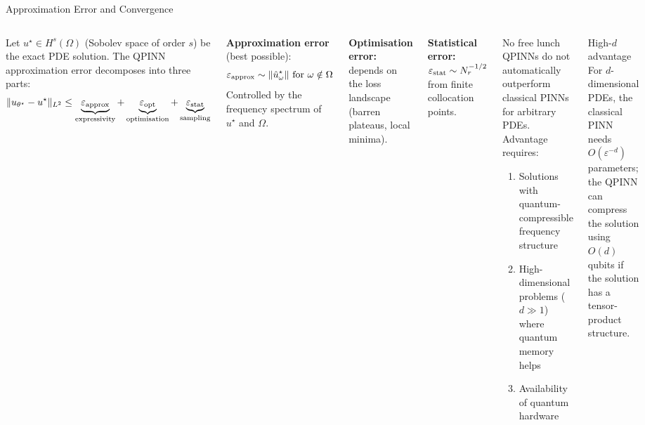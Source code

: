 \documentclass[aspectratio=169,10pt]{beamer}
\begin{document}
\begin{frame}{Approximation Error and Convergence}
  \begin{columns}[T]
      Let $u^\star\in H^s(\Omega)$ (Sobolev space of order $s$)
      be the exact PDE solution. The QPINN approximation error
      decomposes into three parts:
      \[
        \|u_{\theta^\star} - u^\star\|_{L^2}
        \leq \underbrace{\varepsilon_{\rm approx}}_{\text{expressivity}}
           + \underbrace{\varepsilon_{\rm opt}}_{\text{optimisation}}
           + \underbrace{\varepsilon_{\rm stat}}_{\text{sampling}}
      \]

      \textbf{Approximation error} (best possible):
      \[
        \varepsilon_{\rm approx}
        \sim \|\hat{u}^\star_\omega\|
             \text{ for }\omega\notin\Omega
      \]
      Controlled by the frequency spectrum of $u^\star$ and $\Omega$.

      \textbf{Optimisation error:} depends on the loss landscape
      (barren plateaus, local minima).

      \textbf{Statistical error:} $\varepsilon_{\rm stat}
      \sim N_r^{-1/2}$ from finite collocation points.
      \begin{block}{No free lunch}
        QPINNs do not automatically outperform classical
        PINNs for arbitrary PDEs.
        Advantage requires:
        \begin{enumerate}
          \item Solutions with quantum-compressible
                frequency structure
          \item High-dimensional problems ($d\gg 1$)
                where quantum memory helps
          \item Availability of quantum hardware
        \end{enumerate}
      \end{block}
      \vspace{0.2cm}
      \begin{alertblock}{High-$d$ advantage}
        For $d$-dimensional PDEs, the classical PINN needs
        $O(\varepsilon^{-d})$ parameters; the QPINN can
        compress the solution using $O(d)$ qubits if the
        solution has a tensor-product structure.
      \end{alertblock}
  \end{columns}
\end{frame}
\end{document}
